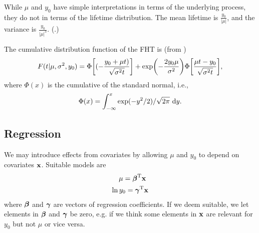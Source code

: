 While $\mu$ and $y_0$ have simple interpretations in terms of the underlying process, they do not in terms of the lifetime distribution. The mean lifetime is $\frac{y_0}{|\mu|}$, and the variance is $\frac{y_0}{|\mu|^3}$. (\cite[62]{caroni2017}.)

The cumulative distribution function of the FHT is (from \cite[7]{threg})
\begin{equation}\label{eq:cumulative}
    F(t|\mu,\sigma^2,y_0)=\Phi\sqb*{(-\frac{y_0+\mu t)}{\sqrt{\sigma^2t}}}+\exp\p*{-\frac{2y_0\mu}{\sigma^2}}\Phi\sqb*{\frac{\mu t-y_0}{\sqrt{\sigma^2t}}},
\end{equation}
where $\Phi(x)$ is the cumulative of the standard normal, i.e.,
\begin{equation}
    \Phi(x)=\int_{-\infty}^x\exp(-y^2/2)/\sqrt{2\pi}\text{~d}y.
\end{equation}

\subsection{Regression}
We may introduce effects from covariates by allowing $\mu$ and $y_0$ to depend on covariates $\mathbf{x}$. Suitable models are
\begin{align}\label{eq:coeffs}
\begin{split}
    \mu=\bbeta^\T\x \\
    \ln y_0=\bgamma^\T\x
\end{split}
\end{align}
where $\boldsymbol{\beta}$ and $\boldsymbol{\gamma}$ are vectors of regression coefficients. If we deem suitable, we let elements in $\boldsymbol{\beta}$ and $\boldsymbol{\gamma}$ be zero, e.g. if we think some elements in $\mathbf{x}$ are relevant for $y_0$ but not $\mu$ or vice versa.

